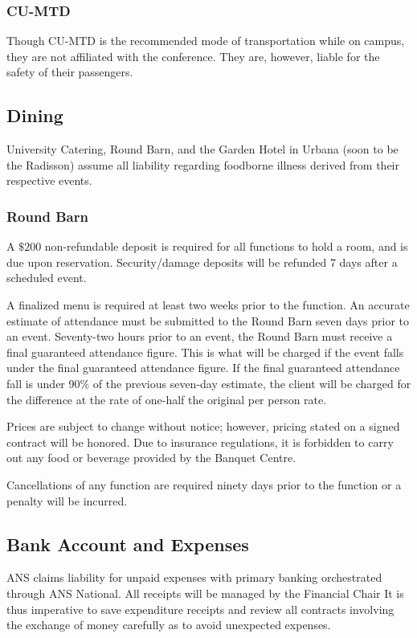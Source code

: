 \subsubsection{CU-MTD}
Though CU-MTD is the recommended mode of transportation while on campus, they are not affiliated with the conference. They are, however, liable for the safety of their passengers.

\subsection{Dining}
University Catering, Round Barn, and the Garden Hotel in Urbana (soon to be the Radisson) assume all liability regarding foodborne illness derived from their respective events.

\subsubsection{Round Barn}
A $\$200$ non-refundable deposit is required for all functions to hold a room, and is due upon reservation. Security/damage deposits will be refunded 7 days after a scheduled event. 

A finalized menu is required at least two weeks prior to the function. An accurate estimate of attendance must be submitted to the Round Barn seven days prior to an event.
Seventy-two hours prior to an event, the Round Barn must receive a final guaranteed attendance figure. This is what will be charged if the event falls under the final guaranteed attendance figure. If the final guaranteed attendance fall is under 90$\%$ of the previous seven-day estimate, the client will be charged for the difference at the rate of one-half the original per person rate.

Prices are subject to change without notice; however, pricing stated on a signed contract will be honored. Due to insurance regulations, it is forbidden to carry out any food or beverage provided by the Banquet Centre.

Cancellations of any function are required ninety days prior to the function or a penalty will be incurred.

\subsection{Bank Account and Expenses}
ANS claims liability for unpaid expenses with primary banking orchestrated through ANS National. All receipts will be managed by the Financial Chair It is thus imperative to save expenditure receipts and review all contracts involving the exchange of money carefully as to avoid unexpected expenses. 

